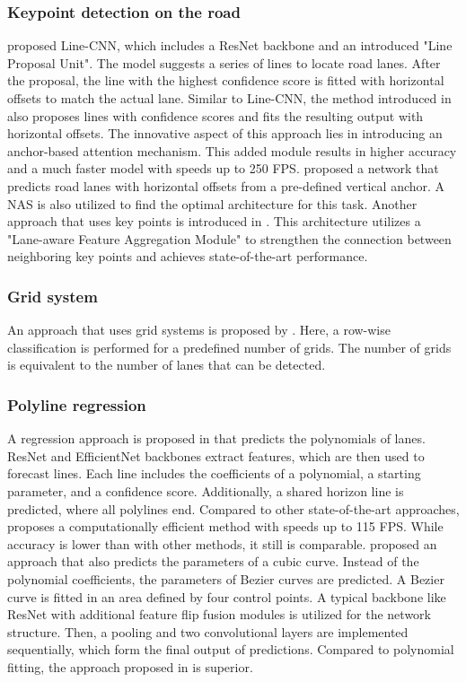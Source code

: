 \subsubsection{Keypoint detection on the road}

\cite{LineCNN2020} proposed Line-CNN, which includes a ResNet backbone and an introduced "Line Proposal Unit".
The model suggests a series of lines to locate road lanes.
After the proposal, the line with the highest confidence score is fitted with horizontal offsets to match the actual lane.
Similar to Line-CNN, the method introduced in \cite{KeepEyesOnLane2021} also proposes lines with confidence scores and fits the resulting output with horizontal offsets.
The innovative aspect of this approach lies in introducing an anchor-based attention mechanism.
This added module results in higher accuracy and a much faster model with speeds up to 250 \ac{FPS}.
\cite{CurveLaneNAS2020} proposed a network that predicts road lanes with horizontal offsets from a pre-defined vertical anchor.
A \ac{NAS} is also utilized to find the optimal architecture for this task.
Another approach that uses key points is introduced in \cite{GANet2022}.
This architecture utilizes a "Lane-aware Feature Aggregation Module" to strengthen the connection between neighboring key points and achieves state-of-the-art performance.

\subsubsection{Grid system}

An approach that uses grid systems is proposed by \cite{laneDetectionGrid2020}.
Here, a row-wise classification is performed for a predefined number of grids.
The number of grids is equivalent to the number of lanes that can be detected.

\subsubsection{Polyline regression}

A regression approach is proposed in \cite{PolyLaneNetRoad2021} that predicts the polynomials of lanes.
ResNet and EfficientNet backbones extract features, which are then used to forecast lines.
Each line includes the coefficients of a polynomial, a starting parameter, and a confidence score.
Additionally, a shared horizon line is predicted, where all polylines end.
Compared to other state-of-the-art approaches, \cite{PolyLaneNetRoad2021} proposes a computationally efficient method with speeds up to 115 \ac{FPS}.
While accuracy is lower than with other methods, it still is comparable.
\cite{DetectingLanesWithBezierCurves2023} proposed an approach that also predicts the parameters of a cubic curve.
Instead of the polynomial coefficients, the parameters of Bezier curves are predicted.
A Bezier curve is fitted in an area defined by four control points.
A typical backbone like ResNet with additional feature flip fusion modules is utilized for the network structure.
Then, a pooling and two convolutional layers are implemented sequentially, which form the final output of predictions.
Compared to polynomial fitting, the approach proposed in \cite{DetectingLanesWithBezierCurves2023} is superior.

